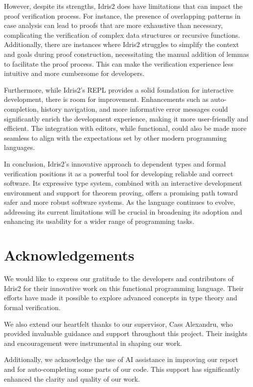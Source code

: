 \documentclass[]{rptuseminar}
\begin{document}
However, despite its strengths, Idris2 does have limitations that can impact the proof verification process. For instance, the presence of overlapping patterns in case analysis can lead to proofs that are more exhaustive than necessary, complicating the verification of complex data structures or recursive functions. Additionally, there are instances where Idris2 struggles to simplify the context and goals during proof construction, necessitating the manual addition of lemmas to facilitate the proof process. This can make the verification experience less intuitive and more cumbersome for developers.

Furthermore, while Idris2's REPL provides a solid foundation for interactive development, there is room for improvement. Enhancements such as auto-completion, history navigation, and more informative error messages could significantly enrich the development experience, making it more user-friendly and efficient. The integration with editors, while functional, could also be made more seamless to align with the expectations set by other modern programming languages.

In conclusion, Idris2's innovative approach to dependent types and formal verification positions it as a powerful tool for developing reliable and correct software. Its expressive type system, combined with an interactive development environment and support for theorem proving, offers a promising path toward safer and more robust software systems. As the language continues to evolve, addressing its current limitations will be crucial in broadening its adoption and enhancing its usability for a wider range of programming tasks.

\newpage
\section*{Acknowledgements}
We would like to express our gratitude to the developers and contributors of Idris2 for their innovative work on this functional programming language. Their efforts have made it possible to explore advanced concepts in type theory and formal verification.

We also extend our heartfelt thanks to our supervisor, Cass Alexandru, who provided invaluable guidance and support throughout this project. Their insights and encouragement were instrumental in shaping our work.

Additionally, we acknowledge the use of AI assistance in improving our report and for auto-completing some parts of our code. This support has significantly enhanced the clarity and quality of our work.

\newpage
\nocite{*}



\end{document}
